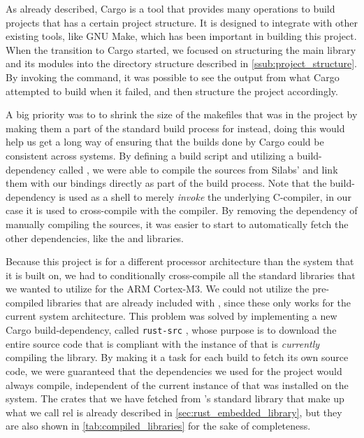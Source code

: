 As already described, Cargo is a tool that provides many operations to build {\rust} projects that has a certain project structure.
It is designed to integrate with other existing tools, like GNU Make, which has been important in  building this project.
When the transition to Cargo started, we focused on structuring the main library and its modules into the directory structure described in \autoref{ssub:project_structure}.
By invoking the  command, it was possible to see the output from what Cargo attempted to build when it failed, and then structure the project accordingly.

A big priority was to to shrink the size of the makefiles that was in the project by making them a part of the standard build process for {\emlib} instead, doing this would help us get a long way of ensuring that the builds done by Cargo could be consistent across systems.
By defining a {\rust} build script and utilizing a {\rust} build-dependency called  \cite{web:cargo_gcc}, we were able to compile the {\C} sources from Silabs' {\emlib} and link them with our bindings directly as part of the build process.
Note that the  build-dependency is used as a shell to merely \emph{invoke} the underlying C-compiler, in our case it is used to cross-compile with the {\armgcc} compiler.
By removing the dependency of manually compiling the {\C} sources, it was easier to start to automatically fetch the other dependencies, like the {\core} and  libraries.

Because this project is for a different processor architecture than the system that it is built on, we had to conditionally cross-compile all the standard {\rust} libraries that we wanted to utilize for the ARM Cortex-M3.
We could not utilize the pre-compiled libraries that are already included with {\rustc}, since these only works for the current system architecture.
This problem was solved by implementing a new Cargo build-dependency, called \texttt{rust-src} \cite{github:rust_src}, whose purpose is to download the entire {\rust} source code that is compliant with the instance of {\rustc} that is \emph{currently} compiling the library.
By making it a task for each build to fetch its own source code, we were guaranteed that the dependencies we used for the project would always compile, independent of the current instance of {\rustc} that was installed on the system.
The crates that we have fetched from {\rust}'s standard library that make up what we call \gls{rel} is already described in \autoref{sec:rust_embedded_library}, but they are also shown in \autoref{tab:compiled_libraries} for the sake of completeness.

